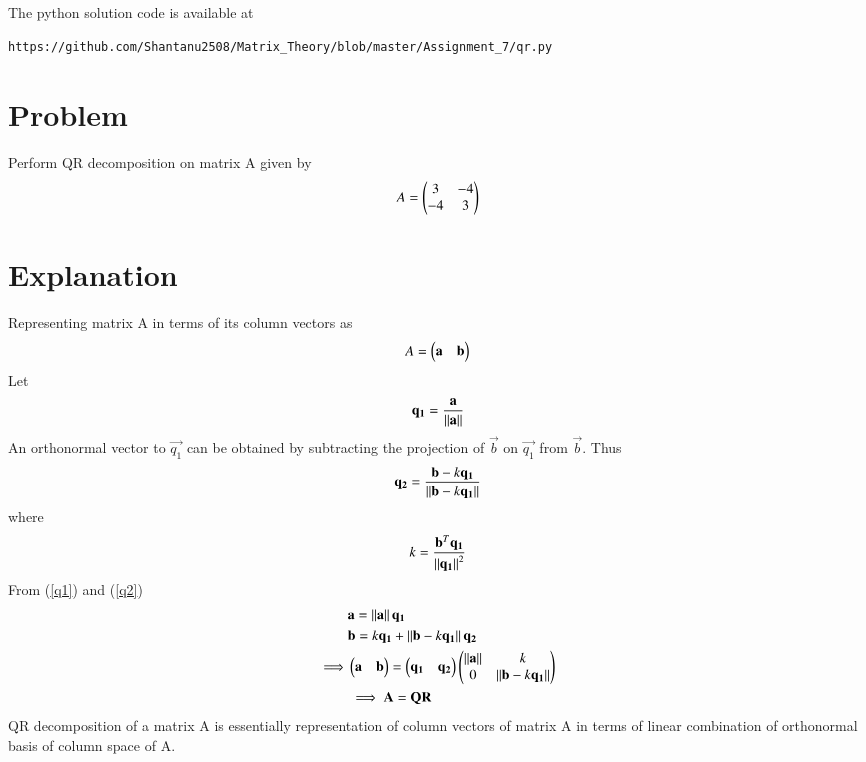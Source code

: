 \documentclass[journal,12pt,twocolumn]{IEEEtran}
\begin{document}
The python solution code is available at
\begin{lstlisting}
https://github.com/Shantanu2508/Matrix_Theory/blob/master/Assignment_7/qr.py
\end{lstlisting}

\section{Problem}
Perform QR decomposition on matrix A given by
\begin{align*}
	A = \begin{pmatrix}3 & -4 \\ -4 & 3\end{pmatrix} 
\end{align*}
\section{Explanation}
Representing matrix A in terms of its column vectors as
\begin{align}
	A=\begin{pmatrix}\mathbf{a} & \mathbf{b}\end{pmatrix}
\end{align}
Let
\begin{align}
	\vec{q_1}=\frac{\vec{a}}{\norm{\vec{a}}} \label{q1} 
\end{align}
An orthonormal vector to $\vec{q_1}$ can be obtained by subtracting the projection of $\vec{b}$ on $\vec{q_1}$ from $\vec{b}$. Thus
\begin{align}
	\vec{q_2}=\frac{\vec{b}-k\vec{q_1}}{\norm{\vec{b}-k\vec{q_1}}} \label{q2}
\end{align}
where
\begin{align}
	k=\frac{\vec{b}^T\vec{q_1}}{\norm{\vec{q_1}}^2} \label{k}
\end{align}
From (\ref{q1}) and (\ref{q2})
\begin{align}
	&\mathbf{a}=\left\lVert\mathbf{a}\right\rVert\mathbf{q_1} \\
	&\mathbf{b}=k\mathbf{q_1} + \left\lVert\mathbf{b}-k\mathbf{q_1}\right\rVert\mathbf{q_2} \\
	\implies 
	&\begin{pmatrix}\mathbf{a} & \mathbf{b}\end{pmatrix}=\begin{pmatrix}\mathbf{q_1} & \mathbf{q_2}\end{pmatrix}
        \begin{pmatrix}\left\lVert\mathbf{a}\right\rVert & k \\ 0 & \left\lVert\mathbf{b}-k\mathbf{q_1}\right\rVert\end{pmatrix} \\
	&\implies \mathbf{A}=\mathbf{Q}\mathbf{R}
\end{align}
QR decomposition of a matrix A is essentially representation of column vectors of matrix A in terms of linear combination of orthonormal basis of column space of A.
\end{document}

